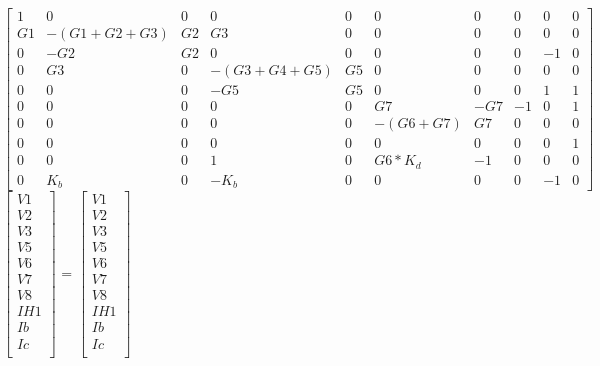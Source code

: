 {\footnotesize

$ \begin{bmatrix}
1 & 0 & 0 & 0 & 0 & 0 & 0 & 0 & 0 & 0 \\
G1 & -(G1+G2+G3) & G2 & G3 & 0 & 0 & 0 & 0 & 0 & 0 \\
0 & -G2 & G2 & 0 & 0 & 0 & 0 & 0 & -1 & 0 \\
0 & G3 & 0 & -(G3+G4+G5) & G5 & 0 & 0 & 0 & 0 & 0 \\
0 & 0 & 0 & -G5 & G5 & 0 & 0 & 0 & 1 & 1 \\
0 & 0 & 0 & 0 & 0 & G7 & -G7 & -1 & 0 & 1 \\
0 & 0 & 0 & 0 & 0 & -(G6+G7) & G7 & 0 & 0 & 0 \\
0 & 0 & 0 & 0 & 0 & 0 & 0 & 0 & 0 & 1 \\
0 & 0 & 0 & 1 & 0 & G6*K_d & -1 & 0 & 0 & 0 \\
0 & K_b & 0 & -K_b & 0 & 0 & 0 & 0 & -1 & 0 
\end{bmatrix}  $
$ \begin{bmatrix}
V1 \\
V2 \\
V3 \\
V5 \\
V6 \\
V7 \\
V8 \\
IH1 \\
Ib \\
Ic \\
\end{bmatrix}  $
=
$ \begin{bmatrix}
V1 \\
V2 \\
V3 \\
V5 \\
V6 \\
V7 \\
V8 \\
IH1 \\
Ib \\
Ic \\
\end{bmatrix}  $
}


